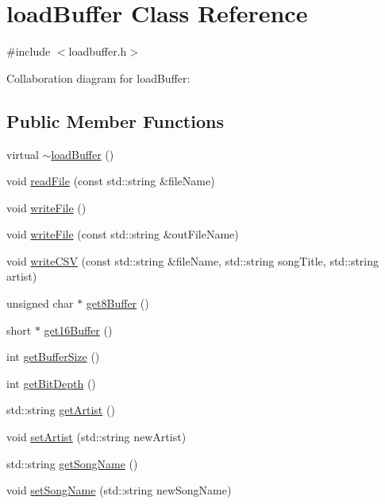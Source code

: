 \hypertarget{classloadBuffer}{}\section{load\+Buffer Class Reference}
\label{classloadBuffer}


{\ttfamily \#include $<$loadbuffer.\+h$>$}



Collaboration diagram for load\+Buffer\+:
\subsection*{Public Member Functions}
\begin{DoxyCompactItemize}
\item 
virtual \hyperlink{classloadBuffer_a569f285c4f37d2880c1619842d54917a}{$\sim$load\+Buffer} ()
\item 
void \hyperlink{classloadBuffer_adfdc981dd37280f382467ecd6fb087c6}{read\+File} (const std\+::string \&file\+Name)
\item 
void \hyperlink{classloadBuffer_af32a4655ecfa6ec67862fc85c0fac0a3}{write\+File} ()
\item 
void \hyperlink{classloadBuffer_a0ebc8576784119627232cff763100695}{write\+File} (const std\+::string \&out\+File\+Name)
\item 
void \hyperlink{classloadBuffer_aa22aefdaddbb00ff09c0e18ba5922dff}{write\+C\+SV} (const std\+::string \&file\+Name, std\+::string song\+Title, std\+::string artist)
\item 
unsigned char $\ast$ \hyperlink{classloadBuffer_ace04b355c2b23c72abd1d322dcb960ee}{get8\+Buffer} ()
\item 
short $\ast$ \hyperlink{classloadBuffer_aa6b14cb999de76cfce307f7036310859}{get16\+Buffer} ()
\item 
int \hyperlink{classloadBuffer_afdb86606188438cef499304c2a0af433}{get\+Buffer\+Size} ()
\item 
int \hyperlink{classloadBuffer_aa4d8b0a75f4459dc0f255f62d822e14b}{get\+Bit\+Depth} ()
\item 
std\+::string \hyperlink{classloadBuffer_a0d57faf2711fc72a2b801f31f38a415e}{get\+Artist} ()
\item 
void \hyperlink{classloadBuffer_a200dc532492d652badbc0db7e8cd7085}{set\+Artist} (std\+::string new\+Artist)
\item 
std\+::string \hyperlink{classloadBuffer_a99cbb74f6dd6f788b13abfc6916207cf}{get\+Song\+Name} ()
\item 
void \hyperlink{classloadBuffer_a90419d6e2793c9aed6e2af2ddc44eec3}{set\+Song\+Name} (std\+::string new\+Song\+Name)
\end{DoxyCompactItemize}


